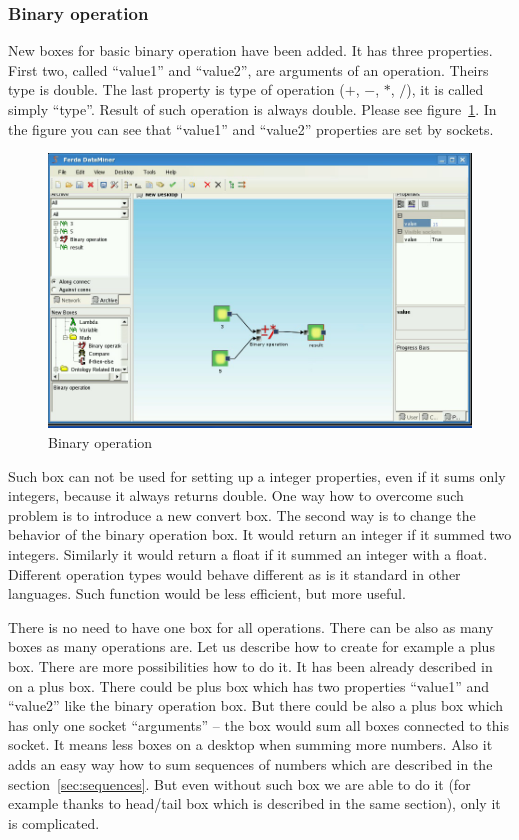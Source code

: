 \documentclass[a4paper,12pt]{book}
\begin{document}
\subsubsection{Binary operation}
New boxes for basic binary operation have been added. It has three properties. First two, called ``value1'' and ``value2'', are arguments of an operation. Theirs type is double. The last property is type of operation ($+$, $-$, $*$, $/$), it is called simply ``type''. Result of such operation is always double. Please see figure~\ref{fig:boxBinaryOperation}. In the figure you can see that ``value1'' and ``value2'' properties are set by sockets.
\begin{figure}
	\includegraphics[width=1\textwidth]{binaryOperation2.png}
	\caption{Binary operation}
	\label{fig:boxBinaryOperation}
\end{figure}

Such box can not be used for setting up a integer properties, even if it sums only integers, because it always returns double. One way how to overcome such problem is to introduce a new convert box. The second way is to change the behavior of the binary operation box. It would return an integer if it summed two integers. Similarly it would return a float if it summed an integer with a float. Different operation types would behave different as is it standard in other languages. Such function would be less efficient, but more useful.  

There is no need to have one box for all operations. There can be also as many boxes as many operations are. Let us describe how to create for example a plus box. There are more possibilities how to do it. It has been already described in~\cite{znalosti2006} on a plus box. There could be plus box which has two properties ``value1'' and ``value2'' like the binary operation box. But there could be also a plus box which has only one socket ``arguments'' -- the box would sum all boxes connected to this socket. It means less boxes on a desktop when summing more numbers. Also it adds an easy way how to sum sequences of numbers which are described in the section~\ref{sec:sequences}. But even without such box we are able to do it (for example thanks to head/tail box which is described in the same section), only it is complicated.    
\end{document}
